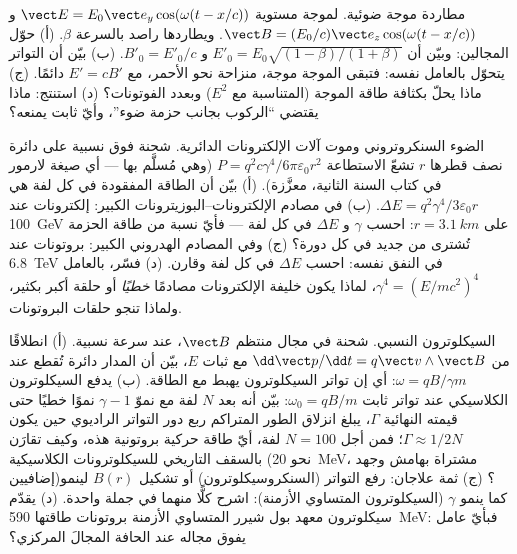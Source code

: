 \begin{exercise}[$\star\star\star$]\label{exo:b3:covariant-electromagnetism:10}
مطاردة موجة ضوئية. لموجة مستوية $\vect E = E_0\vect e_y
\cos(\omega(t - x/c))$ و $\vect B = (E_0/c)\vect e_z\cos(\omega(t -
x/c))$. ويطاردها راصد بالسرعة $\beta$. (أ) حوّل المجالين:
وبيّن أن $E'_0 = E_0\sqrt{(1-\beta)/(1+\beta)}$ و $B'_0 = E'_0/c$. (ب)
بيّن أن التواتر يتحوّل بالعامل نفسه: فتبقى الموجة
موجة، منزاحة نحو الأحمر، مع $E' = cB'$ دائمًا. (ج) ماذا يحلّ
بكثافة طاقة الموجة (المتناسبة مع $E^2$) وبعدد
الفوتونات؟ (د) استنتج: ماذا يقتضي ``الركوب بجانب حزمة ضوء''،
وأيّ ثابت يمنعه؟
\end{exercise}

\begin{exercise}[$\star\star\star$]\label{exo:b3:covariant-electromagnetism:11}
الضوء السنكروتروني وموت آلات الإلكترونات الدائرية. شحنة
فوق نسبية على دائرة نصف قطرها $r$ تشعّ الاستطاعة
$P = q^2c\gamma^4/6\pi\varepsilon_0r^2$ (وهي مُسلَّم بها --- أي صيغة
لارمور في كتاب السنة الثانية، معزَّزة). (أ) بيّن أن الطاقة المفقودة في كل
لفة هي $\Delta E = q^2\gamma^4/3\varepsilon_0r$. (ب) في مصادم
الإلكترونات--البوزيترونات الكبير: إلكترونات عند \qty{100}{GeV} على $r = \qty{3.1}{km}$: احسب $\gamma$ و
$\Delta E$ في كل لفة --- فأيّ نسبة من طاقة الحزمة تُشترى من
جديد في كل دورة؟ (ج) وفي المصادم الهدروني الكبير: بروتونات عند \qty{6.8}{TeV} في النفق نفسه: احسب
$\Delta E$ في كل لفة وقارن. (د) فسّر، بالعامل $\gamma^4 =
(E/mc^2)^4$، لماذا يكون خليفة الإلكترونات مصادمًا
\emph{خطيًا} أو حلقة أكبر بكثير، ولماذا تنجو حلقات البروتونات.
\end{exercise}

\begin{exercise}[$\star\star\star$]\label{exo:b3:covariant-electromagnetism:12}
السيكلوترون النسبي. شحنة في مجال منتظم $\vect B$، عند
سرعة نسبية. (أ) انطلاقًا من $\dd\vect p/\dd t = q\vect v\wedge\vect
B$ مع ثبات $E$، بيّن أن المدار دائرة تُقطع عند
$\omega = qB/\gamma m$: أي إن تواتر السيكلوترون يهبط مع الطاقة.
(ب) يدفع السيكلوترون الكلاسيكي عند تواتر ثابت $\omega_0 = qB/m$: بيّن
أنه بعد $N$ لفة مع نموّ $\gamma - 1$ نموًا خطيًا حتى قيمته
النهائية $\Gamma$، يبلغ انزلاق الطور المتراكم ربع دور
التواتر الراديوي حين يكون $\Gamma \approx 1/2N$؛ فمن أجل $N = 100$ لفة، أيّ طاقة
حركية بروتونية هذه، وكيف تقارَن بالسقف التاريخي
للسيكلوترونات الكلاسيكية (نحو \qty{20}{MeV}، مشتراة بهامش
وجهد إضافيين)؟ (ج) ثمة علاجان:
رفع التواتر (السنكروسيكلوترون) أو تشكيل $B(r)$ لينمو
كما ينمو $\gamma$ (السيكلوترون المتساوي الأزمنة): اشرح كلًّا منهما في جملة
واحدة. (د) يقدّم سيكلوترون معهد بول شيرر المتساوي الأزمنة بروتونات طاقتها \qty{590}{MeV}:
فبأيّ عامل يفوق مجاله عند الحافة المجالَ
المركزي؟
\end{exercise}


